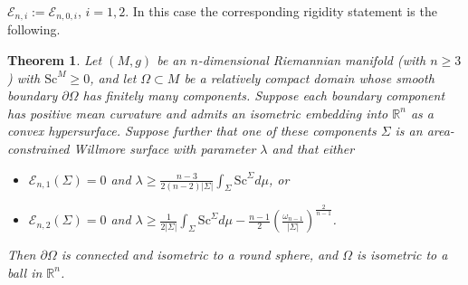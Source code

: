 \documentclass[12pt,a4paper]{amsart}
\theoremstyle{plain}
\newtheorem{theorem}{Theorem}[section]
\theoremstyle{definition}
\begin{document}
$
\mathcal E_{n,i}:=\mathcal E_{n,0,i}$,  $i=1,2$. In this case the corresponding rigidity statement is the following.
\begin{theorem}\label{rigidityhighdim}
    Let $(M,g)$ be an $n$-dimensional Riemannian  manifold (with $n\geq 3$) with $\mathrm{Sc}^M \ge 0$, and let  $\Omega \subset M$ be a relatively compact domain whose smooth boundary  $\partial \Omega $  has finitely many components. Suppose each boundary component has positive mean curvature and admits an isometric embedding into \(\mathbb{R}^n\) as a convex hypersurface.  Suppose further that one of these components $\Sigma $ is an area-constrained Willmore surface with parameter $\lambda$ and that either  
    \begin{itemize}
    \item[$i)$]$\mathcal{E}_{n,1}(\Sigma)=0$ and $
        \lambda  \geq  \frac{n-3}{2(n-2)|\Sigma|}  
  \int_{\Sigma} 
 \mathrm{Sc}^{\Sigma} d\mu$,
     or
    \item[$ii)$] $\mathcal{E}_{n,2}(\Sigma)= 0$ and $
     \lambda  \geq  \frac{1}{2|\Sigma|}\int_{\Sigma} 
 \mathrm{Sc}^{\Sigma} d\mu  -\frac{n-1}{2} \left( \frac{\omega_{n-1}}{ |\Sigma|} \right)^{\frac{2}{n-1}}$.
\end{itemize}
Then $\partial \Omega$ is connected and isometric to a round sphere, and  $\Omega$ is isometric to a ball in $\mathbb{R}^{n}$.
\end{theorem}
\end{document}

